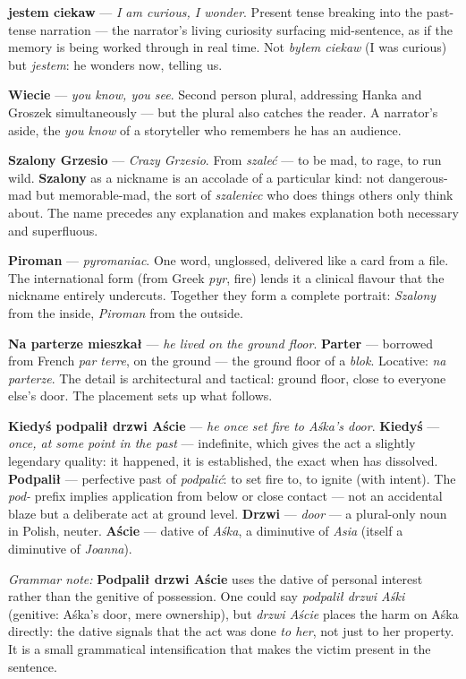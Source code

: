 \textbf{jestem ciekaw} --- \textit{I am curious, I wonder}.
Present tense breaking into the past-tense narration --- the
narrator's living curiosity surfacing mid-sentence, as if the
memory is being worked through in real time. Not \textit{byłem
ciekaw} (I was curious) but \textit{jestem}: he wonders now,
telling us.

\textbf{Wiecie} --- \textit{you know, you see}. Second person
plural, addressing Hanka and Groszek simultaneously --- but
the plural also catches the reader. A narrator's aside, the
\textit{you know} of a storyteller who remembers he has an
audience.

\textbf{Szalony Grzesio} --- \textit{Crazy Grzesio}. From
\textit{szaleć} --- to be mad, to rage, to run wild.
\textbf{Szalony} as a nickname is an accolade of a particular
kind: not dangerous-mad but memorable-mad, the sort of
\textit{szaleniec} who does things others only think about.
The name precedes any explanation and makes explanation both
necessary and superfluous.

\textbf{Piroman} --- \textit{pyromaniac}. One word, unglossed,
delivered like a card from a file. The international form
(from Greek \textit{pyr}, fire) lends it a clinical flavour
that the nickname entirely undercuts. Together they form a
complete portrait: \textit{Szalony} from the inside,
\textit{Piroman} from the outside.

\textbf{Na parterze mieszkał} --- \textit{he lived on the
ground floor}. \textbf{Parter} --- borrowed from French
\textit{par terre}, on the ground --- the ground floor of a
\textit{blok}. Locative: \textit{na parterze}. The detail is
architectural and tactical: ground floor, close to everyone
else's door. The placement sets up what follows.

\textbf{Kiedyś podpalił drzwi Aście} --- \textit{he once set
fire to Aśka's door}. \textbf{Kiedyś} --- \textit{once, at
some point in the past} --- indefinite, which gives the act
a slightly legendary quality: it happened, it is established,
the exact when has dissolved. \textbf{Podpalił} --- perfective
past of \textit{podpalić}: to set fire to, to ignite (with
intent). The \textit{pod-} prefix implies application from
below or close contact --- not an accidental blaze but a
deliberate act at ground level. \textbf{Drzwi} --- \textit{door}
--- a plural-only noun in Polish, neuter. \textbf{Aście} ---
dative of \textit{Aśka}, a diminutive of \textit{Asia} (itself
a diminutive of \textit{Joanna}).

\medskip
\noindent\textit{Grammar note:} \textbf{Podpalił drzwi Aście}
uses the dative of personal interest rather than the genitive
of possession. One could say \textit{podpalił drzwi Aśki}
(genitive: Aśka's door, mere ownership), but \textit{drzwi
Aście} places the harm on Aśka directly: the dative signals
that the act was done \textit{to her}, not just to her
property. It is a small grammatical intensification that
makes the victim present in the sentence.

